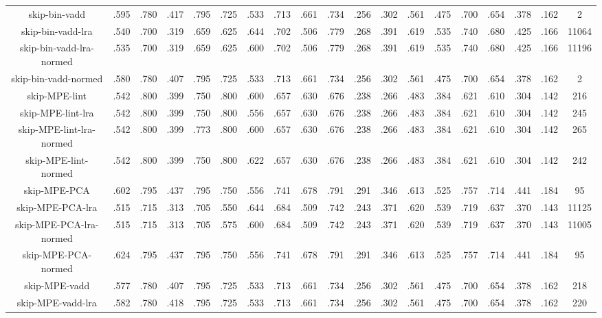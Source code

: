 {{\begin{tabular}{|c|c|c|c|c|c|c|c|c|c|c|c|c|c|c|c|c|c|c|}
    \hline
    skip-bin-vadd & .595 & .780 & .417 & .795 & .725 & .533 & .713 & .661 & .734 & .256 & .302 & .561 & .475 & .700 & .654 & .378 & .162 & 2 \\
    skip-bin-vadd-lra & .540 & .700 & .319 & .659 & .625 & .644 & .702 & .506 & .779 & .268 & .391 & .619 & .535 & .740 & .680 & .425 & .166 & 11064 \\
    skip-bin-vadd-lra-normed & .535 & .700 & .319 & .659 & .625 & .600 & .702 & .506 & .779 & .268 & .391 & .619 & .535 & .740 & .680 & .425 & .166 & 11196 \\
    skip-bin-vadd-normed & .580 & .780 & .407 & .795 & .725 & .533 & .713 & .661 & .734 & .256 & .302 & .561 & .475 & .700 & .654 & .378 & .162 & 2 \\
    \hline
    skip-MPE-lint & .542 & .800 & .399 & .750 & .800 & .600 & .657 & .630 & .676 & .238 & .266 & .483 & .384 & .621 & .610 & .304 & .142 & 216 \\
    skip-MPE-lint-lra & .542 & .800 & .399 & .750 & .800 & .556 & .657 & .630 & .676 & .238 & .266 & .483 & .384 & .621 & .610 & .304 & .142 & 245 \\
    skip-MPE-lint-lra-normed & .542 & .800 & .399 & .773 & .800 & .600 & .657 & .630 & .676 & .238 & .266 & .483 & .384 & .621 & .610 & .304 & .142 & 265 \\
    skip-MPE-lint-normed & .542 & .800 & .399 & .750 & .800 & .622 & .657 & .630 & .676 & .238 & .266 & .483 & .384 & .621 & .610 & .304 & .142 & 242 \\
    \hline
    skip-MPE-PCA & .602 & .795 & .437 & .795 & .750 & .556 & .741 & .678 & .791 & .291 & .346 & .613 & .525 & .757 & .714 & .441 & .184 & 95 \\
    skip-MPE-PCA-lra & .515 & .715 & .313 & .705 & .550 & .644 & .684 & .509 & .742 & .243 & .371 & .620 & .539 & .719 & .637 & .370 & .143 & 11125 \\
    skip-MPE-PCA-lra-normed & .515 & .715 & .313 & .705 & .575 & .600 & .684 & .509 & .742 & .243 & .371 & .620 & .539 & .719 & .637 & .370 & .143 & 11005 \\
    skip-MPE-PCA-normed & .624 & .795 & .437 & .795 & .750 & .556 & .741 & .678 & .791 & .291 & .346 & .613 & .525 & .757 & .714 & .441 & .184 & 95 \\
    \hline
    skip-MPE-vadd & .577 & .780 & .407 & .795 & .725 & .533 & .713 & .661 & .734 & .256 & .302 & .561 & .475 & .700 & .654 & .378 & .162 & 218 \\
    skip-MPE-vadd-lra & .582 & .780 & .418 & .795 & .725 & .533 & .713 & .661 & .734 & .256 & .302 & .561 & .475 & .700 & .654 & .378 & .162 & 220 \\

\end{tabular}}}
